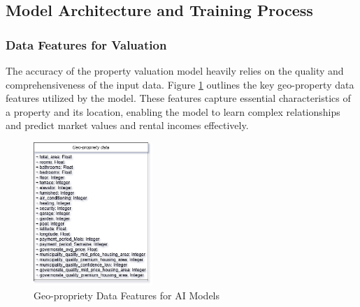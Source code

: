 \subsection{Model Architecture and Training Process}
\subsubsection{Data Features for Valuation}
The accuracy of the property valuation model heavily relies on the quality and comprehensiveness of the input data. Figure \ref{fig:geo-propriety-data} outlines the key geo-property data features utilized by the model. These features capture essential characteristics of a property and its location, enabling the model to learn complex relationships and predict market values and rental incomes effectively.

\begin{figure}[htbp]
    \centering
    \includegraphics[width=0.4\textwidth]{images/geo-propriety-data.png} %
    \caption{Geo-propriety Data Features for AI Models}
    \label{fig:geo-propriety-data}
\end{figure}

